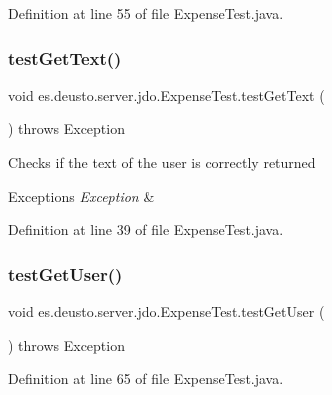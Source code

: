 Definition at line 55 of file Expense\+Test.\+java.

\mbox{\label{classes_1_1deusto_1_1server_1_1jdo_1_1_expense_test_a07a19f73b071030eea8864b86e394794}} 
\subsubsection{\texorpdfstring{test\+Get\+Text()}{testGetText()}}
{\footnotesize\ttfamily void es.\+deusto.\+server.\+jdo.\+Expense\+Test.\+test\+Get\+Text (\begin{DoxyParamCaption}{ }\end{DoxyParamCaption}) throws Exception}

Checks if the text of the user is correctly returned 
\begin{DoxyExceptions}{Exceptions}
{\em Exception} & \\
\hline
\end{DoxyExceptions}


Definition at line 39 of file Expense\+Test.\+java.

\mbox{\label{classes_1_1deusto_1_1server_1_1jdo_1_1_expense_test_a2b21c0ad0d040cfed79bb52c9123e3d0}} 
\subsubsection{\texorpdfstring{test\+Get\+User()}{testGetUser()}}
{\footnotesize\ttfamily void es.\+deusto.\+server.\+jdo.\+Expense\+Test.\+test\+Get\+User (\begin{DoxyParamCaption}{ }\end{DoxyParamCaption}) throws Exception}



Definition at line 65 of file Expense\+Test.\+java.


